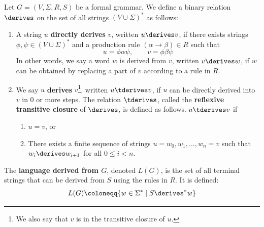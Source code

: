   \begin{definition}[Derivation]
    Let $G = (V, \Sigma, R, S)$ be a formal grammar. We define a binary relation $\derives$ on the set of all strings $(V \cup \Sigma)^\ast$ as follows: 
    \begin{enumerate}
      \item A string $u$ \textbf{directly derives} $v$, written $u \derives v$, if there exists strings $\phi, \psi \in (V \cup \Sigma)^\ast$ and a production rule $(\alpha \to \beta) \in R$ such that 
        \begin{equation}
          u = \phi \alpha \psi, \qquad v = \phi \beta \psi
        \end{equation}
        In other words, we say a word $w$ is derived from $v$, written $v \derives w$, if $w$ can be obtained by replacing a part of $v$ according to a rule in $R$. 

      \item We say $u$ \textbf{derives} $v$\footnote{We also say that $v$ is in the transitive closure of $u$.}, written $u \tderives v$, if $u$ can be directly derived into $v$ in $0$ or more steps. The relation $\tderives$, called the \textbf{reflexive transitive closure} of $\derives$, is defined as follows. $u \tderives v$ if 
        \begin{enumerate}
          \item $u = v$, or 
          \item There exists a finite sequence of strings $u = w_0, w_1, \ldots, w_n = v$ such that $w_i \derives w_{i+1}$ for all $0 \leq i < n$. 
        \end{enumerate}

    \end{enumerate}
  \end{definition}

  \begin{definition}
    The \textbf{language derived from $G$}, denoted $L(G)$, is the set of all terminal strings that can be derived from $S$ using the rules in $R$. It is defined: 
    \begin{equation}
      L(G) \coloneqq \{ w \in \Sigma^\ast \mid S \derives^\ast w \}
    \end{equation}
  \end{definition}

